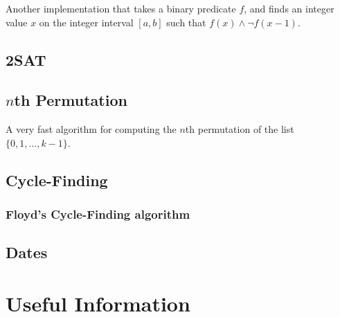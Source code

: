 \documentclass[8pt,a4paper]{amsart}
\begin{document}
Another implementation that takes a binary predicate $f$, and finds an integer value $x$ on the integer interval $[a,b]$ such that $f(x) \land \lnot f(x - 1)$.


\subsection{2SAT}


\subsection{$n$th Permutation}
A very fast algorithm for computing the $n$th permutation of the list $\{0,1,\ldots,k-1\}$.


\subsection{Cycle-Finding}
\subsubsection{Floyd's Cycle-Finding algorithm}


\subsection{Dates}


\section{Useful Information}
\end{document}
